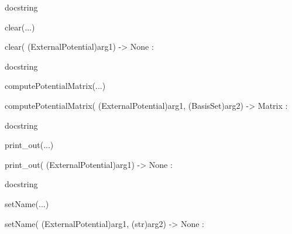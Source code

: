 \documentclass[letterpaper,10pt,english]{sphinxmanual}
\begin{document}
\begin{description}
\begin{description}
\begin{DUlineblock}{0em}
\begin{DUlineblock}{\DUlineblockindent}
\begin{DUlineblock}{\DUlineblockindent}
\item[] docstring
\item[] 
\end{DUlineblock}
\end{DUlineblock}
\item[] clear(...)
\item[]
\begin{DUlineblock}{\DUlineblockindent}
\item[] clear( (ExternalPotential)arg1) -\textgreater{} None :
\item[]
\begin{DUlineblock}{\DUlineblockindent}
\item[] docstring
\item[] 
\end{DUlineblock}
\end{DUlineblock}
\item[] computePotentialMatrix(...)
\item[]
\begin{DUlineblock}{\DUlineblockindent}
\item[] computePotentialMatrix( (ExternalPotential)arg1, (BasisSet)arg2) -\textgreater{} Matrix :
\item[]
\begin{DUlineblock}{\DUlineblockindent}
\item[] docstring
\item[] 
\end{DUlineblock}
\end{DUlineblock}
\item[] print\_out(...)
\item[]
\begin{DUlineblock}{\DUlineblockindent}
\item[] print\_out( (ExternalPotential)arg1) -\textgreater{} None :
\item[]
\begin{DUlineblock}{\DUlineblockindent}
\item[] docstring
\item[] 
\end{DUlineblock}
\end{DUlineblock}
\item[] setName(...)
\item[]
\begin{DUlineblock}{\DUlineblockindent}
\item[] setName( (ExternalPotential)arg1, (str)arg2) -\textgreater{} None :
\item[]
\begin{DUlineblock}{\DUlineblockindent}

\end{DUlineblock}
\end{DUlineblock}
\end{DUlineblock}
\end{description}
\end{description}
\end{document}
